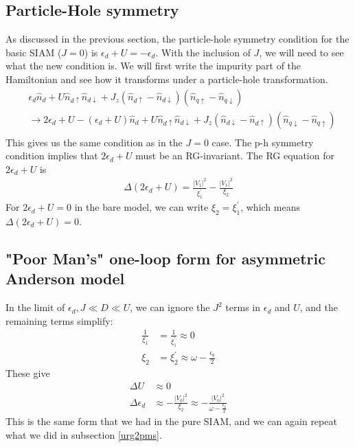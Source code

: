 \documentclass[twoside]{report}
\numberwithin{equation}{section}
\begin{document}
\subsection{Particle-Hole symmetry}
As discussed in the previous section, the particle-hole symmetry condition for the basic SIAM (\(J=0\)) is \(\epsilon_d + U = -\epsilon_d\). With the inclusion of \(J\), we will need to see what the new condition is. We will first write the impurity part of the Hamiltonian and see how it transforms under a particle-hole transformation.
\begin{equation}\begin{aligned}
	&\epsilon_d \hat n_d + U \hat n_{d\uparrow}\hat n_{d\downarrow} + J_z \left(\hat n_{d\uparrow} - \hat n_{d\downarrow}\right)\left(\hat n_{q\uparrow} - \hat n_{q\downarrow}\right)\\
&	\rightarrow 2\epsilon_d + U  -\left(\epsilon_d + U\right)\hat n_d + U \hat n_{d\uparrow}\hat n_{d\downarrow} + J_z \left(\hat n_{d\downarrow} - \hat n_{d\uparrow}\right)\left(\hat n_{q\downarrow} - \hat n_{q\uparrow}\right)\\
\end{aligned}\end{equation}
This gives us the same condition as in the \(J=0\) case. The p-h symmetry condition implies that \(2\epsilon_d + U\) must be an RG-invariant. The RG equation for \(2\epsilon_d + U\) is
\begin{equation}\begin{aligned}
	\Delta \left(2\epsilon_d + U\right) = \frac{|V_1|^2}{\xi_1^\prime} - \frac{|V_1|^2}{\xi_2}
\end{aligned}\end{equation}
For \(2\epsilon_d + U=0\) in the bare model, we can write \(\xi_2 = \xi_1^\prime\), which means \(\Delta \left(2\epsilon_d + U\right) = 0\).
\subsection{"Poor Man's" one-loop form for asymmetric Anderson model}
In the limit of \(\epsilon_d, J \ll D \ll U \), we can ignore the \(J^2\) terms in \(\epsilon_d\) and \(U\), and the remaining terms simplify:
\begin{equation}\begin{aligned}
	\frac{1}{\xi_1} &= \frac{1}{\xi_1^\prime} \approx 0\\
	\xi_2 &= \xi_2^\prime \approx \omega - \frac{\epsilon_q}{2}
\end{aligned}\end{equation}
These give
\begin{equation}\begin{aligned}
	\Delta U &\approx 0 \\
	\Delta \epsilon_d &\approx - \frac{|V_0|^2}{\xi_2} \approx -\frac{|V_0|^2}{\omega - \frac{\epsilon_q}{2}}
\end{aligned}\end{equation}
This is the same form that we had in the pure SIAM, and we can again repeat what we did in subsection \ref{urg2pms}.
\end{document}
